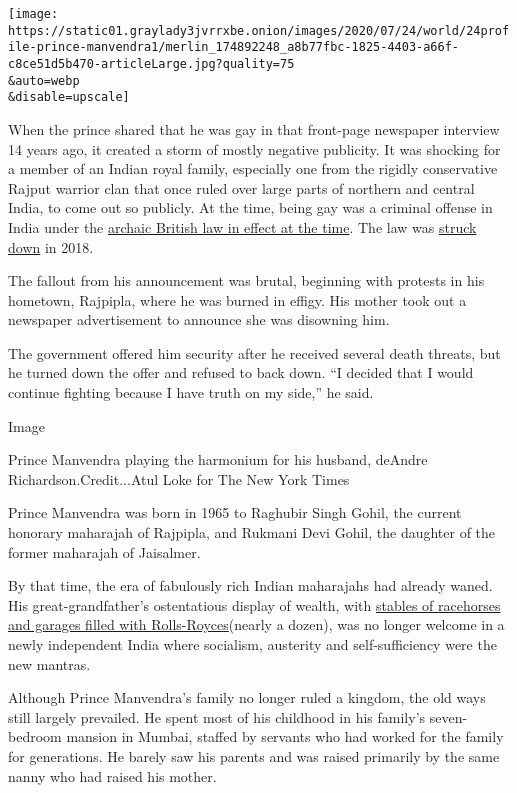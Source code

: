 \texttt{[image: https://static01.graylady3jvrrxbe.onion/images/2020/07/24/world/24profile-prince-manvendra1/merlin\_174892248\_a8b77fbc-1825-4403-a66f-c8ce51d5b470-articleLarge.jpg?quality=75\\\&auto=webp\\\&disable=upscale]}

When the prince shared that he was gay in that front-page newspaper
interview 14 years ago, it created a storm of mostly negative publicity.
It was shocking for a member of an Indian royal family, especially one
from the rigidly conservative Rajput warrior clan that once ruled over
large parts of northern and central India, to come out so publicly. At
the time, being gay was a criminal offense in India under the
\href{https://www.nytimes3xbfgragh.onion/2018/06/02/world/asia/gay-in-india-where-progress-has-come-only-with-risk.html?searchResultPosition=5}{archaic
British law in effect at the time}. The law was
\href{https://www.nytimes3xbfgragh.onion/2018/09/06/world/asia/india-gay-sex-377.html}{struck
down} in 2018.

The fallout from his announcement was brutal, beginning with protests in
his hometown, Rajpipla, where he was burned in effigy. His mother took
out a newspaper advertisement to announce she was disowning him.

The government offered him security after he received several death
threats, but he turned down the offer and refused to back down. ``I
decided that I would continue fighting because I have truth on my
side,'' he said.

Image

Prince Manvendra playing the harmonium for his husband, deAndre
Richardson.Credit...Atul Loke for The New York Times

Prince Manvendra was born in 1965 to Raghubir Singh Gohil, the current
honorary maharajah of Rajpipla, and Rukmani Devi Gohil, the daughter of
the former maharajah of Jaisalmer.

By that time, the era of fabulously rich Indian maharajahs had already
waned. His great-grandfather's ostentatious display of wealth, with
\href{https://economictimes.indiatimes.com/erstwhile-royals-rally-to-bring-back-vintage-rolls-royce-sold-overseas/articleshow/20608569.cms?from=mdr}{stables
of racehorses and garages filled with Rolls-Royces}(nearly a dozen), was
no longer welcome in a newly independent India where socialism,
austerity and self-sufficiency were the new mantras.

Although Prince Manvendra's family no longer ruled a kingdom, the old
ways still largely prevailed. He spent most of his childhood in his
family's seven-bedroom mansion in Mumbai, staffed by servants who had
worked for the family for generations. He barely saw his parents and was
raised primarily by the same nanny who had raised his mother.

